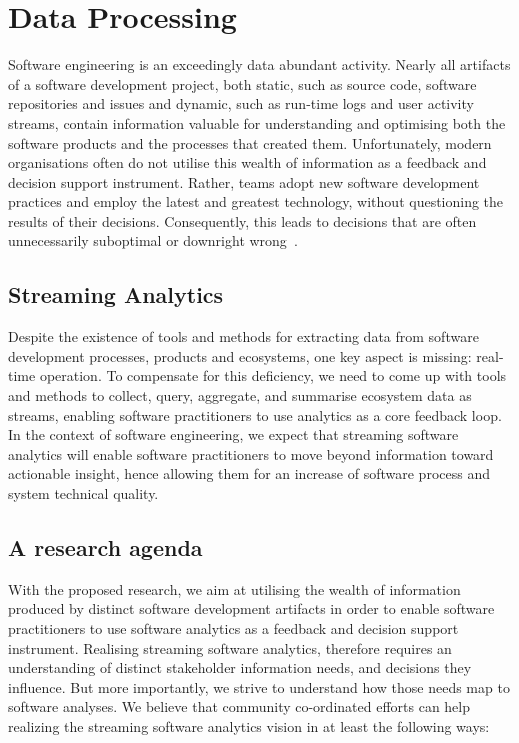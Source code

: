 \chapter{Data Processing}

Software engineering is an exceedingly data abundant activity. Nearly all
artifacts of a software development project, both static, such as source code,
software repositories and issues and dynamic, such as run-time logs and user
activity streams, contain information valuable for understanding and optimising
both the software products and the processes that created them. Unfortunately,
modern organisations often do not utilise this
wealth of information as a feedback and decision support instrument. Rather,
teams adopt new software development practices and employ the latest and
greatest technology, without questioning the results of their decisions.
Consequently, this leads to decisions that are often unnecessarily suboptimal
or downright wrong~\cite{Strigini:1996:IntuitionBasedDecisions}.

\section{Streaming Analytics}

Despite the existence of tools and methods for extracting data from software
development processes, products and ecosystems, one key aspect is missing:
real-time operation. To compensate for this deficiency, we need to come
up with
tools and methods to collect, query, aggregate, and summarise ecosystem data
as streams, enabling software practitioners to use analytics as a
core feedback loop. In the context of software engineering, we expect that
streaming software analytics will enable software practitioners to move beyond
information toward actionable insight, hence allowing them for an increase of
software process and system technical quality. \vspace{0.5mm}

\section{A research agenda}

With the proposed research, we aim at utilising the wealth of information
produced by distinct software development artifacts in order to enable software
practitioners to use software analytics as a feedback and decision support
instrument. Realising streaming software analytics, therefore requires an
understanding of distinct stakeholder information needs, and decisions they
influence. But more importantly, we strive to understand how those needs map to
software analyses. We believe that community co-ordinated efforts can help
realizing the streaming software analytics vision in at least the following
ways:

